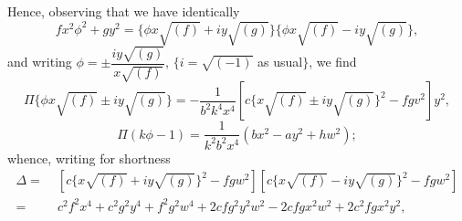 \documentclass[11pt,a4paper]{article}
\begin{document}
Hence, observing that we have identically
\[
fx^{2}\phi^{2} + gy^{2} = \{\phi x\sqrt{(f)} + iy\sqrt{(g)}\}\{\phi x\sqrt{(f)} - iy\sqrt{(g)}\},
\]
and writing $\phi = \pm \dfrac{iy\sqrt{(g)}}{x\sqrt{(f)}}$, $\{i = \sqrt{(-1)}$ as usual$\}$, we find
\[
\Pi\{\phi x\sqrt{(f)} \pm iy\sqrt{(g)}\} = -\frac{1}{b^{2}k^{4}x^{4}}\left[c\{x\sqrt{(f)} \pm iy\sqrt{(g)}\}^{2} - fgv^{2}\right]y^{2},
\]
\[
\Pi(k\phi - 1) = \frac{1}{k^{2}b^{2}x^{4}}(bx^{2} - ay^{2} + hw^{2});
\]
whence, writing for shortness
\[
\begin{aligned}
\Delta =\;& \left[c\{x\sqrt{(f)} + iy\sqrt{(g)}\}^{2} - fgw^{2}\right]\left[c\{x\sqrt{(f)} - iy\sqrt{(g)}\}^{2} - fgw^{2}\right] \\
=\;& c^{2}f^{2}x^{4} + c^{2}g^{2}y^{4} + f^{2}g^{2}w^{4} + 2cfg^{2}y^{2}w^{2} - 2cfgx^{2}w^{2} + 2c^{2}fgx^{2}y^{2},
\end{aligned}
\]

\newpage

\end{document}
